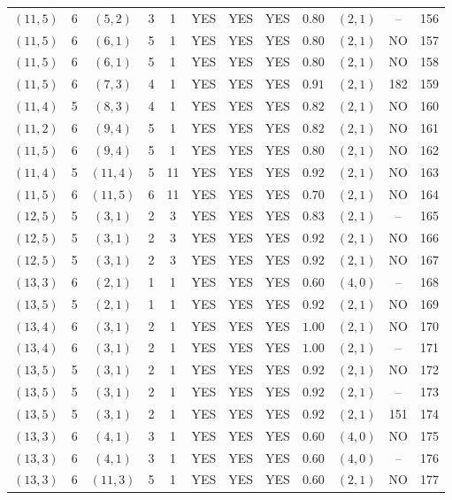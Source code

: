 \begin{longtable}{|c|c|c|c|c|c|c|c|c|c|c|c|}
$(11,5)$ & 6 & $(5,2)$ & 3 & 1 & YES & YES & YES & $0.80$ & $(2,1)$ & -- & 156\\
$(11,5)$ & 6 & $(6,1)$ & 5 & 1 & YES & YES & YES & $0.80$ & $(2,1)$ & NO & 157\\
$(11,5)$ & 6 & $(6,1)$ & 5 & 1 & YES & YES & YES & $0.80$ & $(2,1)$ & NO & 158\\
$(11,5)$ & 6 & $(7,3)$ & 4 & 1 & YES & YES & YES & $0.91$ & $(2,1)$ & 182 & 159\\
$(11,4)$ & 5 & $(8,3)$ & 4 & 1 & YES & YES & YES & $0.82$ & $(2,1)$ & NO & 160\\
$(11,2)$ & 6 & $(9,4)$ & 5 & 1 & YES & YES & YES & $0.82$ & $(2,1)$ & NO & 161\\
$(11,5)$ & 6 & $(9,4)$ & 5 & 1 & YES & YES & YES & $0.80$ & $(2,1)$ & NO & 162\\
$(11,4)$ & 5 & $(11,4)$ & 5 & 11 & YES & YES & YES & $0.92$ & $(2,1)$ & NO & 163\\
$(11,5)$ & 6 & $(11,5)$ & 6 & 11 & YES & YES & YES & $0.70$ & $(2,1)$ & NO & 164\\
$(12,5)$ & 5 & $(3,1)$ & 2 & 3 & YES & YES & YES & $0.83$ & $(2,1)$ & -- & 165\\
$(12,5)$ & 5 & $(3,1)$ & 2 & 3 & YES & YES & YES & $0.92$ & $(2,1)$ & NO & 166\\
$(12,5)$ & 5 & $(3,1)$ & 2 & 3 & YES & YES & YES & $0.92$ & $(2,1)$ & NO & 167\\
$(13,3)$ & 6 & $(2,1)$ & 1 & 1 & YES & YES & YES & $0.60$ & $(4,0)$ & -- & 168\\
$(13,5)$ & 5 & $(2,1)$ & 1 & 1 & YES & YES & YES & $0.92$ & $(2,1)$ & NO & 169\\
$(13,4)$ & 6 & $(3,1)$ & 2 & 1 & YES & YES & YES & $1.00$ & $(2,1)$ & NO & 170\\
$(13,4)$ & 6 & $(3,1)$ & 2 & 1 & YES & YES & YES & $1.00$ & $(2,1)$ & -- & 171\\
$(13,5)$ & 5 & $(3,1)$ & 2 & 1 & YES & YES & YES & $0.92$ & $(2,1)$ & NO & 172\\
$(13,5)$ & 5 & $(3,1)$ & 2 & 1 & YES & YES & YES & $0.92$ & $(2,1)$ & -- & 173\\
$(13,5)$ & 5 & $(3,1)$ & 2 & 1 & YES & YES & YES & $0.92$ & $(2,1)$ & 151 & 174\\
$(13,3)$ & 6 & $(4,1)$ & 3 & 1 & YES & YES & YES & $0.60$ & $(4,0)$ & NO & 175\\
$(13,3)$ & 6 & $(4,1)$ & 3 & 1 & YES & YES & YES & $0.60$ & $(4,0)$ & -- & 176\\
$(13,3)$ & 6 & $(11,3)$ & 5 & 1 & YES & YES & YES & $0.60$ & $(2,1)$ & NO & 177\\

\end{longtable}

